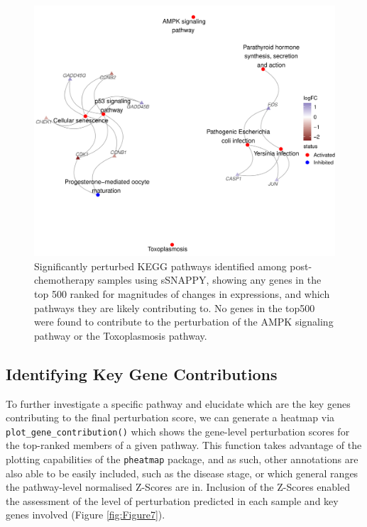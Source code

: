 \documentclass[9pt,a4paper,]{extarticle}
\begin{document}
\begin{figure}

{\centering \includegraphics[width=0.8\linewidth]{sSNAPPY_paper_files/figure-latex/Figure6-1} 

}

\caption{Significantly perturbed KEGG pathways identified among post-chemotherapy samples using sSNAPPY, showing any genes in the top 500 ranked for magnitudes of changes in expressions, and which pathways they are likely contributing to. No genes in the top500 were found to contribute to the perturbation of the AMPK signaling pathway or the Toxoplasmosis pathway.}\label{fig:Figure6}
\end{figure}

\hypertarget{identifying-key-gene-contributions}{%
\subsection{Identifying Key Gene Contributions}\label{identifying-key-gene-contributions}}

To further investigate a specific pathway and elucidate which are the key genes contributing to the final perturbation score, we can generate a heatmap via \texttt{plot\_gene\_contribution()} which shows the gene-level perturbation scores for the top-ranked members of a given pathway.
This function takes advantage of the plotting capabilities of the \texttt{pheatmap} package\citep{pheatmap}, and as such, other annotations are also able to be easily included, such as the disease stage, or which general ranges the pathway-level normalised Z-Scores are in.
Inclusion of the Z-Scores enabled the assessment of the level of perturbation predicted in each sample and key genes involved (Figure \ref{fig:Figure7}).
\end{document}
